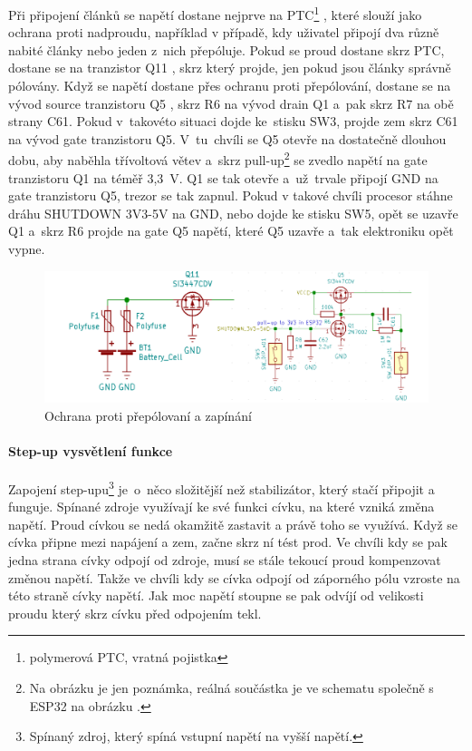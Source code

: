 Při připojení článků se napětí dostane nejprve na PTC\footnote{polymerová PTC, vratná pojistka } \parencite{polyfuse},
které slouží jako ochrana proti nadproudu, například v případě, kdy uživatel připojí dva různě nabité články nebo jeden z~nich přepóluje.
Pokud se proud dostane skrz PTC, dostane se na tranzistor Q11 \parencite{power_MOSFET}, skrz který projde, jen pokud jsou články správně pólovány.
Když se napětí dostane přes ochranu proti přepólování, dostane se na 
vývod source
tranzistoru Q5 \parencite{power_MOSFET}, skrz R6 na vývod drain
Q1 a~pak skrz R7 na obě strany C61.
Pokud v~takovéto situaci dojde ke~stisku SW3, projde zem skrz C61 na vývod gate tranzistoru Q5. 
V~tu~chvíli se Q5 otevře na dostatečně dlouhou dobu, 
aby naběhla třívoltová větev a~skrz pull-up\footnote{Na obrázku je jen poznámka, reálná součástka je ve schematu společně s ESP32 na obrázku .}
se zvedlo napětí na gate tranzistoru Q1 na téměř 3,3~V. Q1 se tak otevře a~už~trvale připojí GND na gate tranzistoru Q5, trezor se tak zapnul. Pokud v takové chvíli procesor stáhne dráhu SHUTDOWN 3V3-5V 
na GND, nebo dojde ke stisku SW5, opět se uzavře Q1 a~skrz R6 projde na gate Q5 napětí, které Q5 uzavře a~tak elektroniku opět vypne.

\begin{figure}[h]
    \centering
    \includegraphics[width=\textwidth]{kapitoly/obrazky/E4/napajeni/ochrana_proti_prepolovani_a_zapinani.png}
    \caption{Ochrana proti přepólovaní a zapínání}
    \label{fig:E4-zapinani}
\end{figure}



\paragraph*{Step-up vysvětlení funkce}
Zapojení step-upu\footnote{Spínaný zdroj, který spíná vstupní napětí na vyšší napětí.} je~o~něco složitější než stabilizátor, který stačí připojit a funguje. 
Spínané zdroje využívají ke své funkci cívku, na které vzniká změna napětí. Proud cívkou se nedá okamžitě zastavit a právě toho se využívá. 
Když se cívka připne mezi napájení a zem, začne skrz ní tést prod. Ve chvíli kdy se pak jedna strana cívky odpojí od zdroje, musí se stále tekoucí proud kompenzovat změnou napětí.
Takže ve chvíli kdy se cívka odpojí od záporného pólu vzroste na této straně cívky napětí. 
Jak moc napětí stoupne se pak odvíjí od velikosti proudu který skrz cívku před odpojením tekl.

